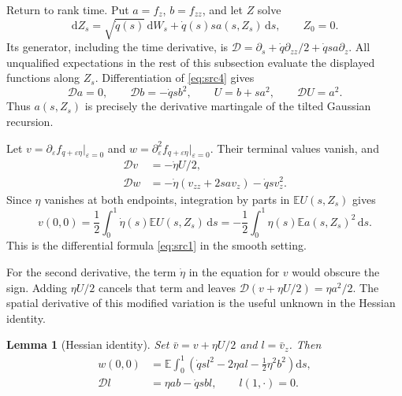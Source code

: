 \documentclass[11pt,a4paper]{article}
\numberwithin{equation}{section}
\newtheorem{lemma}[theorem]{Lemma}
\theoremstyle{definition}
\theoremstyle{remark}
\newcommand{\E}{\mathbb E}
\newcommand{\dd}{\mathrm d}
\begin{document}
Return to rank time.  Put $a=f_z$, $b=f_{zz}$, and let $Z$ solve
\begin{equation}
 \dd Z_s=\sqrt{\dot q(s)}\,\dd W_s+
       \dot q(s)s a(s,Z_s)\,\dd s,\qquad Z_0=0.
 \label{eq:conc-diffusion}
\end{equation}
Its generator, including the time derivative, is
$\mathcal D=\partial_s+\dot q\partial_{zz}/2+\dot q s a\partial_z$.
All unqualified expectations in the rest of this subsection evaluate the
displayed functions along $Z_s$.  Differentiation of
\eqref{eq:src4} gives
\[
 \mathcal D a=0,\qquad \mathcal D b=-\dot q s b^2,
 \qquad U=b+s a^2,\qquad \mathcal D U=a^2.
\]
Thus $a(s,Z_s)$ is precisely the derivative martingale of the tilted
Gaussian recursion.

Let $v=\partial_\varepsilon f_{q+\varepsilon\eta}|_{\varepsilon=0}$ and
$w=\partial_\varepsilon^2 f_{q+\varepsilon\eta}|_{\varepsilon=0}$.
Their terminal values vanish, and
\begin{align}
 \mathcal Dv&=-\dot\eta U/2,\nonumber\\
 \mathcal Dw&=-\dot\eta(v_{zz}+2s a v_z)-\dot q s v_z^2.
 \label{eq:conc-linearized}
\end{align}
Since $\eta$ vanishes at both endpoints, integration by parts in
$\E U(s,Z_s)$ gives
\[
 v(0,0)=\frac12\int_0^1\dot\eta(s)\E U(s,Z_s)\,\dd s
       =-\frac12\int_0^1\eta(s)\E a(s,Z_s)^2\,\dd s.
\]
This is the differential formula \eqref{eq:src1} in the smooth setting.

For the second derivative, the term $\dot\eta$ in the equation for $v$
would obscure the sign.  Adding $\eta U/2$ cancels that term and leaves
$\mathcal D(v+\eta U/2)=\eta a^2/2$.  The spatial derivative of this
modified variation is the useful unknown in the Hessian identity.

\begin{lemma}[Hessian identity]
\label{lem:conc-hessian}
Set $\bar v=v+\eta U/2$ and $l=\bar v_z$.  Then
\begin{equation}
 \begin{split}
 w(0,0)&=\E\int_0^1
 \left(\dot q s l^2-2\eta a l-\frac12\eta^2b^2\right)\dd s,\\
 \mathcal Dl&=\eta a b-\dot q s b l,\qquad l(1,\cdot)=0.
 \end{split}
 \label{eq:src5}
\end{equation}
\end{lemma}
\end{document}
